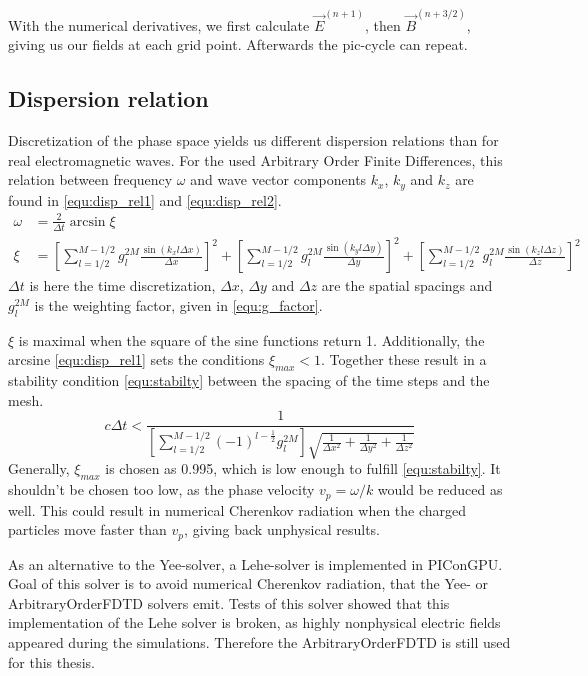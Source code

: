 \documentclass[bachelor_thesis]{subfiles}
\begin{document}
With the numerical derivatives, we first calculate $\vec{E}^{(n+1)}$, then $\vec{B}^{(n+3/2)}$, giving us our fields at each grid point. Afterwards the \gls{pic}-cycle can repeat.

\subsection{Dispersion relation}
Discretization of the phase space yields us different dispersion relations than for real  electromagnetic waves. For the used Arbitrary Order Finite Differences, this relation
between frequency $\omega$ and wave vector components $k_x$, $k_y$ and $k_z$ are found in \autoref{equ:disp_rel1} and \autoref{equ:disp_rel2}.
\begin{align}
\omega&=\frac{2}{\Delta t} \arcsin  \xi 			\label{equ:disp_rel1}	\\
\xi &= \left[\sum\limits_{l=1/2}^{M - 1/2} g_l^{2M} \frac{\sin( k_x l \Delta x)}{\Delta x} \right]^2
	+ \left[\sum\limits_{l=1/2}^{M - 1/2} g_l^{2M} \frac{\sin( k_y l \Delta y)}{\Delta y} \right]^2 + \left[\sum\limits_{l=1/2}^{M - 1/2} g_l^{2M} \frac{\sin( k_z l \Delta z)}{\Delta z} \right]^2 	\label{equ:disp_rel2}
\end{align}
$\Delta t$ is here the time discretization, $\Delta x$, $\Delta y$ and $\Delta z$ are the spatial spacings and $g_l^{2M}$ is the weighting factor, given in \autoref{equ:g_factor}.

$\xi$ is maximal when the square of the sine functions return 1. Additionally, the arcsine \autoref{equ:disp_rel1} sets the conditions $\xi_{max} < 1$.
Together these result in a stability condition \autoref{equ:stabilty} between the spacing of the time steps and the mesh.
\begin{equation}
c\Delta t < \frac{1}{ \left[ \sum\limits_{l=1/2}^{M - 1/2} (-1)^{l-\frac{1}{2}} g_l^{2M} \right] \sqrt{ \frac{1}{\Delta x^2} + \frac{1}{\Delta y^2} + \frac{1}{\Delta z^2} }}
\label{equ:stabilty}
\end{equation}
Generally, $\xi_{max}$ is chosen as 0.995, which is low enough to fulfill \autoref{equ:stabilty}. It shouldn't be chosen too low, as the phase velocity $v_p=\omega/k$
would be reduced as well. This could result in numerical Cherenkov radiation when the charged particles move faster than $v_p$, giving back unphysical results.

As an alternative to the Yee-solver, a Lehe-solver \cite{Lehe2013} is implemented in PIConGPU. Goal of this solver is to avoid numerical Cherenkov radiation, that the Yee- or ArbitraryOrderFDTD solvers emit.
Tests of this solver showed that this implementation of the Lehe solver is broken, as highly nonphysical electric fields appeared during the simulations. Therefore the ArbitraryOrderFDTD is still used for this thesis.
\end{document}
